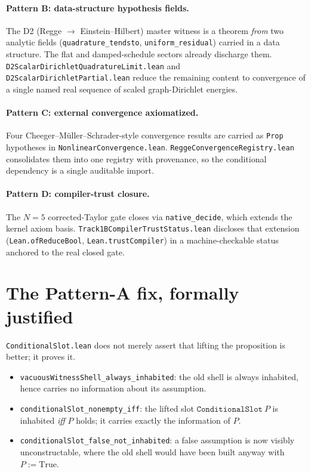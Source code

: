 \documentclass[11pt,letterpaper]{article}
\newcommand{\lmod}[1]{\texttt{#1}}
\begin{document}
\paragraph{Pattern B: data-structure hypothesis fields.}
The D2 (Regge $\to$ Einstein--Hilbert) master witness is a theorem \emph{from}
two analytic fields (\texttt{quadrature\_tendsto}, \texttt{uniform\_residual})
carried in a data structure. The flat and damped-schedule sectors already
discharge them. \lmod{D2ScalarDirichletQuadratureLimit.lean} and
\lmod{D2ScalarDirichletPartial.lean} reduce the remaining content to convergence
of a single named real sequence of scaled graph-Dirichlet energies.

\paragraph{Pattern C: external convergence axiomatized.}
Four Cheeger--M\"uller--Schrader-style convergence results are carried as
\texttt{Prop} hypotheses in \lmod{NonlinearConvergence.lean}.
\lmod{ReggeConvergenceRegistry.lean} consolidates them into one registry with
provenance, so the conditional dependency is a single auditable import.

\paragraph{Pattern D: compiler-trust closure.}
The $N{=}5$ corrected-Taylor gate closes via \texttt{native\_decide}, which
extends the kernel axiom basis. \lmod{Track1BCompilerTrustStatus.lean} discloses
that extension (\texttt{Lean.ofReduceBool}, \texttt{Lean.trustCompiler}) in a
machine-checkable status anchored to the real closed gate.

\section{The Pattern-A fix, formally justified}
\label{sec:patternA}

\lmod{ConditionalSlot.lean} does not merely assert that lifting the proposition is
better; it proves it.

\begin{itemize}[nosep]
\item \texttt{vacuousWitnessShell\_always\_inhabited}: the old shell is always
inhabited, hence carries no information about its assumption.
\item \texttt{conditionalSlot\_nonempty\_iff}: the lifted slot
$\texttt{ConditionalSlot}\ P$ is inhabited \emph{iff} $P$ holds; it carries
exactly the information of $P$.
\item \texttt{conditionalSlot\_false\_not\_inhabited}: a false assumption is now
visibly unconstructable, where the old shell would have been built anyway with
$P := \mathrm{True}$.
\end{itemize}
\end{document}
